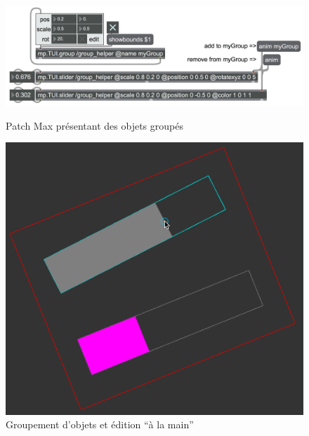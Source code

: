 \begin{figure}[!htbp]
	\captionsetup{format=plain}%
	\centering
	\begin{minipage}[t]{0.48\textwidth}
		\includegraphics[width=\linewidth]{gfx/06_visual_representation/mpTUI_groups_patcher.png}
		\caption{Patch Max présentant des objets groupés}
		\label{fig:visual_representation:groups_patch}
	\end{minipage}
	\hspace{.02\linewidth}
	\begin{minipage}[t]{0.48\textwidth}
	    \includegraphics[width=\linewidth]{gfx/06_visual_representation/mpTUI_groups.png}
		\caption{Groupement d'objets et édition ``à la main''}
		\label{fig:visual_representation:groups}
	\end{minipage}
\end{figure}

